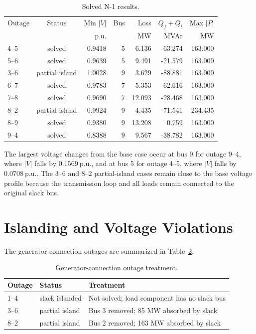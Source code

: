 \documentclass[11pt]{article}
\newcommand{\pu}{\mathrm{p.u.}}
\begin{document}
\begin{table}[htbp]
\centering
\caption{Solved N-1 results.}
\label{tab:solved}
\small
\begin{tabular}{@{}lcrrrrr@{}}
\toprule
Outage & Status & Min $|V|$ & Bus & Loss & $Q_f+Q_t$ & Max $|P|$ \\
 & & p.u. & & MW & MVAr & MW \\
\midrule
4--5 & solved & 0.9418 & 5 & 6.136 & -63.274 & 163.000 \\
5--6 & solved & 0.9639 & 5 & 9.491 & -21.579 & 163.000 \\
3--6 & partial island & 1.0028 & 9 & 3.629 & -88.881 & 163.000 \\
6--7 & solved & 0.9783 & 7 & 5.353 & -62.616 & 163.000 \\
7--8 & solved & 0.9690 & 7 & 12.093 & -28.468 & 163.000 \\
8--2 & partial island & 0.9924 & 9 & 4.435 & -71.541 & 234.435 \\
8--9 & solved & 0.9380 & 9 & 13.208 & 0.759 & 163.000 \\
9--4 & solved & 0.8388 & 9 & 9.567 & -38.782 & 163.000 \\
\bottomrule
\end{tabular}
\end{table}

The largest voltage changes from the base case occur at bus 9 for outage
9--4, where $|V|$ falls by $0.1569~\pu$, and at bus 5 for outage 4--5,
where $|V|$ falls by $0.0708~\pu$. The 3--6 and 8--2 partial-island cases
remain close to the base voltage profile because the transmission loop and
all loads remain connected to the original slack bus.

\section{Islanding and Voltage Violations}

The generator-connection outages are summarized in Table~\ref{tab:islands}.

\begin{table}[htbp]
\centering
\caption{Generator-connection outage treatment.}
\label{tab:islands}
\begin{tabular}{@{}lll@{}}
\toprule
Outage & Status & Treatment \\
\midrule
1--4 & slack islanded & Not solved; load component has no slack bus \\
3--6 & partial island & Bus 3 removed; 85 MW absorbed by slack \\
8--2 & partial island & Bus 2 removed; 163 MW absorbed by slack \\
\bottomrule
\end{tabular}
\end{table}
\end{document}
